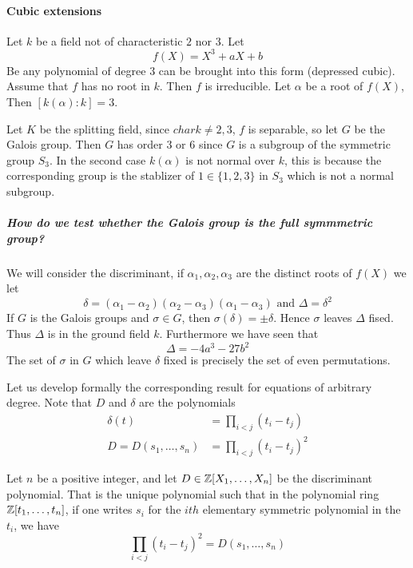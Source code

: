   \paragraph*{Cubic extensions}
  \begin{example}
    Let $k$ be a field not of characteristic $2$ nor $3$. Let \[
      f(X) = X^3 + aX +b  
    \]
    Be any polynomial of degree $3$ can be brought into this form (depressed cubic). Assume that $f$ has no root in $k$. Then $f$ is irreducible. Let $\alpha$ be a root of $f(X)$, Then $[k(\alpha)\colon k] = 3$.

    Let $K$ be the splitting field, since $char k\neq 2,3$, $f$ is separable, so let $G$ be the Galois group. Then $G$ has order $3$ or $6$ since $G$ is a subgroup of the symmetric group $S_3$. In the second case $k(\alpha)$ is not normal over $k$, this is because the corresponding group is the stablizer of $1\in \{1,2,3\}$ in $S_3$ which is not a normal subgroup.
    
    \subparagraph*{How do we test whether the Galois group is the full symmmetric group?}
    We will consider the discriminant, if $\alpha_1,\alpha_2,\alpha_3$ are the distinct roots of $f(X)$ we let\[
      \delta = (\alpha_1-\alpha_2)(\alpha_2-\alpha_3)(\alpha_1-\alpha_3) \text{ and }\Delta = \delta^2  
    \]
    If $G$ is the Galois groups and $\sigma\in G$, then $\sigma(\delta) = \pm \delta$. Hence $\sigma$ leaves $\Delta$ fised. Thus $\Delta$ is in the ground field $k$. Furthermore we have seen that \[
      \Delta = -4a^3-27b^2  
    \]
	The set of $\sigma$ in $G$ which leave $\delta$ fixed is precisely the set of even permutations.
	\begin{bergman}
		Let us develop formally the corresponding result for equations of arbitrary degree. Note that $D$ and $\delta$ are the polynomials 
		\begin{align*}
			\delta(t) &= \prod_{i<j}(t_i-t_j)\\
			D = D(s_1,\ldots,s_n)&= \prod_{i<j}{(t_i-t_j)}^2
		\end{align*}
    \begin{lemma}
      Let $n$ be a positive integer, and let $D\in \mathbb{Z}[X_1,\ldots,X_n]$ be the discriminant polynomial. That is the unique polynomial such that in the polynomial ring $\mathbb{Z}[t_1,\ldots,t_n]$, if one writes $s_i$ for the $ith$ elementary symmetric polynomial in the $t_i$, we have \[
          \prod_{i<j} {(t_i-t_j)}^2 = D(s_1,\ldots,s_n)  
      \]


\end{lemma}
\end{bergman}
\end{example}
